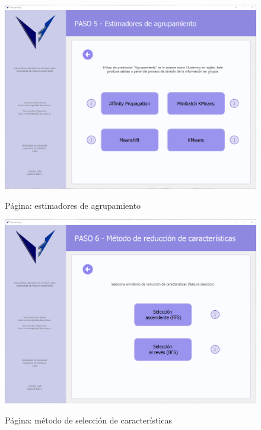 \begin{figure}[H]
    \centering
    \caption{Página: estimadores de agrupamiento}
    \includegraphics[width=\textwidth]{views/clustering_estimators.png}
    \label{fig:clusterestimators}
\end{figure}

\begin{figure}[H]
    \centering
    \caption{Página: método de selección de características}
    \includegraphics[width=\textwidth]{views/feature_selection_method.png}
    \label{fig:featureselectionmethod}
\end{figure}

